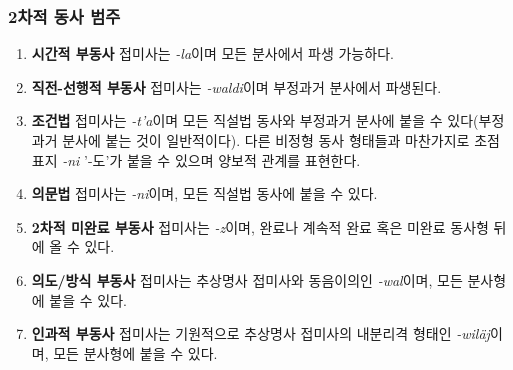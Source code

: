 \subsubsection{2차적 동사 범주}
\begin{enumerate}
	\item \textbf{시간적 부동사} 접미사는 \textit{-la}이며 모든 분사에서 파생 가능하다.
	\item \textbf{직전-선행적 부동사} 접미사는 \textit{-waldi}이며 부정과거 분사에서 파생된다.
	\item \textbf{조건법} 접미사는 \textit{-t'a}이며 모든 직설법 동사와 부정과거 분사에 붙을 수 있다(부정과거 분사에 붙는 것이 일반적이다). 다른 비정형 동사 형태들과 마찬가지로 초점 표지 \textit{-ni} '-도'가 붙을 수 있으며 양보적 관계를 표현한다.
	\item \textbf{의문법} 접미사는 \textit{-ni}이며, 모든 직설법 동사에 붙을 수 있다.
	\item \textbf{2차적 미완료 부동사} 접미사는 \textit{-z}이며, 완료나 계속적 완료 혹은 미완료 동사형 뒤에 올 수 있다.
	\item \textbf{의도/방식 부동사} 접미사는 추상명사 접미사와 동음이의인 \textit{-wal}이며, 모든 분사형에 붙을 수 있다.
	\item \textbf{인과적 부동사} 접미사는 기원적으로 추상명사 접미사의 내분리격 형태인 \textit{-wiläj}이며, 모든 분사형에 붙을 수 있다.
\end{enumerate}
